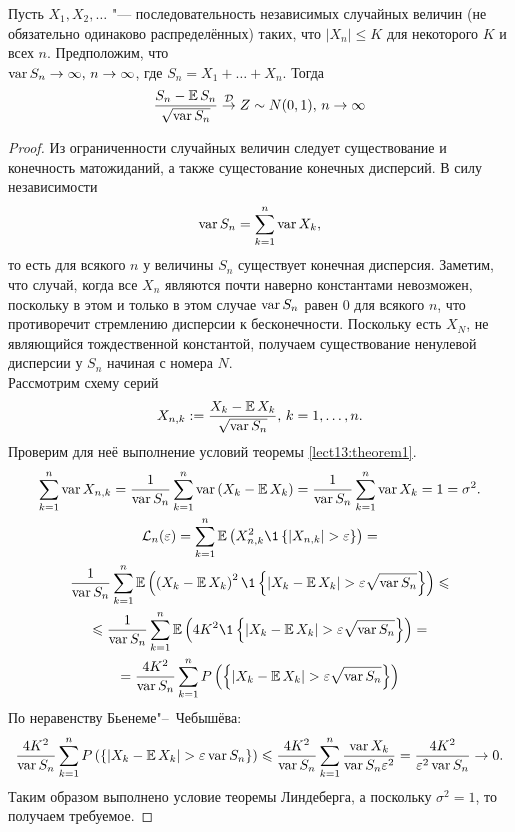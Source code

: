 \begin{theorem}\label{lect13:theorem5}
Пусть $X_1, X_2, \ldots$ "--- последовательность независимых случайных величин (не обязательно одинаково распределённых) таких, что $\left|X_n\right| \leqslant K$ для некоторого $K$ и всех $n$. Предположим, что \\$\operatorname*{var} S_n \to \infty, \, n \to \infty$, где $S_n = X_1 + \ldots + X_n$.
Тогда
$$
\frac{S_n - \operatorname*{\mathbb{E}} S_n}{\sqrt{\operatorname*{var} S_n}} \overset{\mathcal{D}}{\to} Z \sim N(0, 1), \, n \to \infty
$$
\end{theorem}
\begin{proof}
Из ограниченности случайных величин следует существование и конечность матожиданий, а также сущестование конечных дисперсий. 
В силу независимости
$$
\operatorname*{var} S_n = \sum_{k = 1}^n \operatorname*{var} X_k,
$$
то есть для всякого $n$ у величины $S_n$ существует конечная дисперсия.
Заметим, что  случай, когда все $X_n$ являются почти наверно константами невозможен, поскольку в этом и только в этом случае $\operatorname*{var} S_n$ равен $0$ для всякого $n$, что противоречит стремлению дисперсии к бесконечности. 
Поскольку есть $X_N$, не являющийся тождественной константой, получаем существование ненулевой дисперсии у $S_n$ начиная с номера $N$. 
\\Рассмотрим схему серий 
$$
X_{n, k} := \frac{X_k - \operatorname*{\mathbb{E}} X_k}{\sqrt{\operatorname*{var} S_n}}, \, k = 1, \ldots, n.
$$
Проверим для неё выполнение условий теоремы \ref{lect13:theorem1}. 
\begin{multline*}
\sum_{k = 1}^n \var X_{n, k} = \frac{1}{\var S_n} \sum_{k = 1}^n \var \left( X_k - \E X_k \right) =  \frac{1}{\var S_n} \sum_{k = 1}^n  \var X_k = 1 = \sigma^2.
\\
\mathcal{L}_n(\eps) = \sum\limits_{k = 1}^n \E \left(X_{n, k}^2 \1\left\{\left|X_{n, k}\right| > \eps\right\}\right) = 
\\
 \frac{1}{\var S_n} \sum_{k = 1}^n \E \left(\left(X_k - \E X_k\right)^2 \1\left\{\left|X_k - \E X_k \right| > \eps \sqrt{\var S_n}\right\}\right) \leqslant
\\
\leqslant  \frac{1}{\var S_n} \sum_{k = 1}^n \E \left(4K^2 \1\left\{\left|X_k - \E X_k \right| > \eps \sqrt{\var S_n}\right\}\right) =
\\
 = \frac{4K^2}{\var S_n} \sum_{k = 1}^n \P \left(\left\{\left|X_k - \E X_k \right| > \eps \sqrt{\var S_n}\right\}\right)
\end{multline*}
По неравенству Бьенеме"--~Чебышёва:
$$
\frac{4K^2}{\operatorname*{var} S_n} \sum_{k = 1}^n P \left(\left\{\left|X_k - \operatorname*{\mathbb{E}} X_k \right| > \varepsilon \operatorname*{var} S_n\right\}\right) \leqslant \frac{4K^2}{\operatorname*{var} S_n} \sum_{k = 1}^n \frac{\operatorname*{var} X_k}{\operatorname*{var} S_n \varepsilon^2} = \frac{4K^2}{\varepsilon^2\operatorname*{var} S_n} \to 0.
$$
Таким образом выполнено условие теоремы Линдеберга, а поскольку $\sigma^2 = 1$, то получаем требуемое.
\end{proof}

